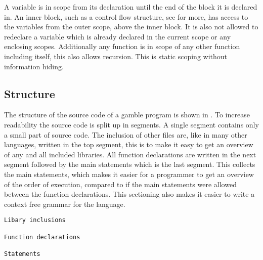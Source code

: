 A variable is in scope from its declaration until the end of the block it is declared in.
An inner block, such as a control flow structure, see  for more, has access to the variables from the outer scope, above the inner block. 
It is also not allowed to redeclare a variable which is already declared in the current scope or any enclosing scopes. 
Additionally any function is in scope of any other function including itself, this also allows recursion. 
This is static scoping without information hiding. 

\subsection*{Structure}\label{subsec:Struc}
The structure of the source code of a \gls{gamble} program is shown in .
To increase readability the source code is split up in segments.
A single segment contains only a small part of source code.
The inclusion of other files are, like in many other languages, written in the top segment, this is to make it easy to get an overview of any and all included libraries. 
All function declarations are written in the next segment followed by the main statements which is the last segment.
This collects the main statements, which makes it easier for a programmer to get an overview of the order of execution, compared to if the main statements were allowed between the function declarations.
This sectioning also makes it easier to write a context free grammar for the language. 

\begin{lstlisting}[caption={Source code file layout in \gls{gamble}},frame=tlrb,label={lst:Structure}, numbers=none]
Libary inclusions

Function declarations

Statements
\end{lstlisting}                           